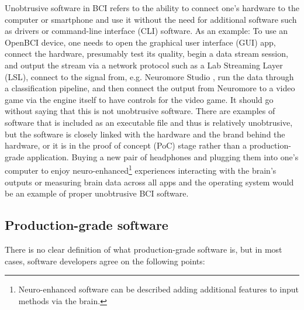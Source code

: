 Unobtrusive software in BCI refers to the ability to connect one's hardware to the computer or smartphone and use it without the need for additional software such as drivers or command-line interface (CLI) software. As an example: To use an OpenBCI device, one needs to open the graphical user interface (GUI) app, connect the hardware, presumably test its quality, begin a data stream session, and output the stream via a network protocol such as a Lab Streaming Layer (LSL), connect to the signal from, e.g. Neuromore Studio \citep{openbci_neuromore_nodate}, run the data through a classification pipeline, and then connect the output from Neuromore to a video game via the engine itself to have controls for the video game. It should go without saying that this is not unobtrusive software. There are examples of software that is included as an executable file and thus is relatively unobtrusive, but the software is closely linked with the hardware and the brand behind the hardware, or it is in the proof of concept (PoC) stage rather than a production-grade application. Buying a new pair of headphones and plugging them into one's computer to enjoy neuro-enhanced\footnote{Neuro-enhanced software can be described adding additional features to input methods via the brain.} experiences interacting with the brain's outputs or measuring brain data across all apps and the operating system would be an example of proper unobtrusive BCI software.

\subsection{Production-grade software}
\label{chapter2-production-grade-software}

There is no clear definition of what production-grade software is, but in most cases, software developers agree on the following points:

